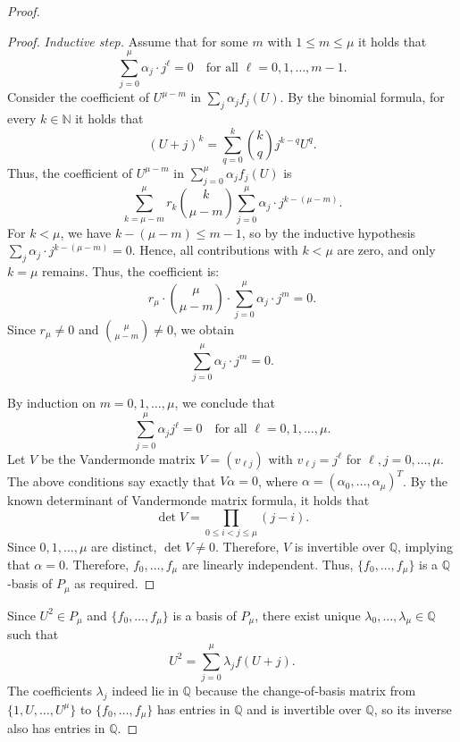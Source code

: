\documentclass{article}
\theoremstyle{plain}
\theoremstyle{definition}
\theoremstyle{remark}
\begin{document}
\begin{proof}
\begin{proof}
		\smallskip
		\emph{Inductive step.}
		Assume that for some $m$ with $1 \le m \le \mu$ it holds that
		\[
		\sum_{j=0}^{\mu} \alpha_j \cdot j^\ell = 0
		\quad\text{for all } \ell = 0,1,\dots,m-1.
		\]
		Consider the coefficient of $U^{{\mu}-m}$ in $\sum_j \alpha_j f_j(U)$.
		By the binomial formula, for every $k \in \mathbb{N}$ it holds that 
		\[
		(U+j)^k
		= \sum_{q=0}^k \binom{k}{q} j^{k-q} U^q.
		\]
		Thus, the coefficient of $U^{{\mu}-m}$ in $\sum_{j=0}^{\mu} \alpha_j f_j(U)$ is
		\[
		\sum_{k=\mu-m}^{\mu}
		r_k \binom{k}{{\mu}-m}
		\sum_{j=0}^{\mu} \alpha_j \cdot j^{k-({\mu}-m)}.
		\]
		For $k<\mu$, we have $k-({\mu}-m) \le m-1$, so by the inductive hypothesis
		\(\sum_j \alpha_j \cdot j^{k-({\mu}-m)} = 0\). Hence, all contributions with $k<{\mu}$
		are zero, and only $k={\mu}$ remains. Thus, the coefficient is:
		\[
		r_{\mu} \cdot \binom{{\mu}}{{\mu}-m} \cdot \sum_{j=0}^{\mu} \alpha_j \cdot j^m = 0.
		\]
		Since $r_{\mu} \neq 0$ and $\binom{{\mu}}{{\mu}-m} \neq 0$, we obtain
		\[
		\sum_{j=0}^{\mu} \alpha_j \cdot j^m = 0.
		\]
		
		By induction on $m=0,1,\dots,{\mu}$, we conclude that
		\[
		\sum_{j=0}^{\mu} \alpha_j j^\ell = 0
		\quad\text{for all } \ell = 0,1,\dots,{\mu}.
		\]
		Let $V$ be the Vandermonde matrix $V = (v_{\ell j})$ with
		$v_{\ell j} = j^\ell$ for $\ell,j=0,\dots,{\mu}$.
		The above conditions say exactly that $V \alpha = 0$, where
		$\alpha = (\alpha_0,\dots,\alpha_{\mu})^T$. By the known determinant of Vandermonde matrix formula, it holds that 
		\[
		\det V = \prod_{0 \le i < j \le {\mu}} (j - i).
		\]
		Since $0,1,\dots,{\mu}$ are distinct, $\det V \neq 0$. Therefore, $V$ is invertible
		over $\mathbb{Q}$, implying that $\alpha = 0$.
		Therefore, $f_0,\ldots, f_{\mu}$ are linearly independent. 
		Thus, $\{f_0,\dots,f_{\mu}\}$ is a $\mathbb{Q}$‑basis of $P_{\mu}$ as required. 
			\end{proof}

	
	Since $U^2 \in P_{\mu}$ and $\{f_0,\dots,f_{\mu}\}$ is a basis of $P_{\mu}$, there exist
	unique $\lambda_0,\dots,\lambda_{\mu} \in \mathbb{Q}$ such that
	\begin{equation}\label{eq:U2-expansion}
		U^2 = \sum_{j=0}^{\mu} \lambda_j f(U+j).
	\end{equation}
	The coefficients $\lambda_j$ indeed lie in $\mathbb{Q}$ because the change‑of‑basis matrix from
	$\{1,U,\dots,U^{\mu}\}$ to $\{f_0,\dots,f_{\mu}\}$ has entries in $\mathbb{Q}$ and
	is invertible over $\mathbb{Q}$, so its inverse also has entries in
	$\mathbb{Q}$.
	

\end{proof}
\end{document}
